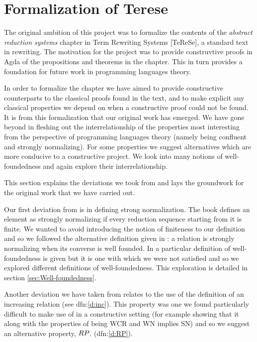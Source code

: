 \section{Formalization of Terese}
\label{sec:Formalization}
The original ambition of this project was to formalize the contents of the \emph{abstract reduction 
systems} chapter in Term Rewriting Systems [TeReSe], a standard text in rewriting. 
The motivation for the project was to provide construvtive proofs in Agda 
of the propositions and theorems in the chapter. This in turn provides a foundation for 
future work in programming languages theory. 

In order to formalize the chapter we have aimed to provide constructive counterparts to the 
classical proofs found in the text, and to make explicit any classical properties we depend 
on when a constructive proof could not be found. It is from this formalization that our 
original work has emerged. We have gone beyond \terese in fleshing out the interrelationship 
of the properties most interesting from the perspective of programming languages theory (namely 
being confluent and strongly normalizing). 
For some properties we suggest alternatives which are more conducive to a constructive project. 
We look into many notions of well-foundedness and again explore their interrelationship. 

This section explains the deviations we took from \terese and lays the groundwork for the original work 
that we have carried out. 


Our first deviation from \terese is in defining strong normalization. The book defines 
an element as strongly normalizing if every reduction sequence starting from it is finite. 
We wanted to avoid introducing the notion of finiteness to our definition and so we 
followed the alternative definition given in \terese : a relation is strongly normalizing when its 
converse is well founded. In \terese a particular definition of well-foundedness is given but 
it is one with which we were not satisfied and so we explored different definitions of 
well-foundedness. This exploration is detailed in section \ref{sec:Well-foundedness}. 

Another deviation we have taken from \terese relates to the use of the definition of an 
increasing relation (see dfn:\ref{d:inc}). This property was one we found particularly difficult 
to make use of in a constructive setting (for example showing that it along with the properties 
of being WCR and WN implies SN) and so we suggest an alternative property, $\RP$.
(dfn:\ref{d:RP}). 



